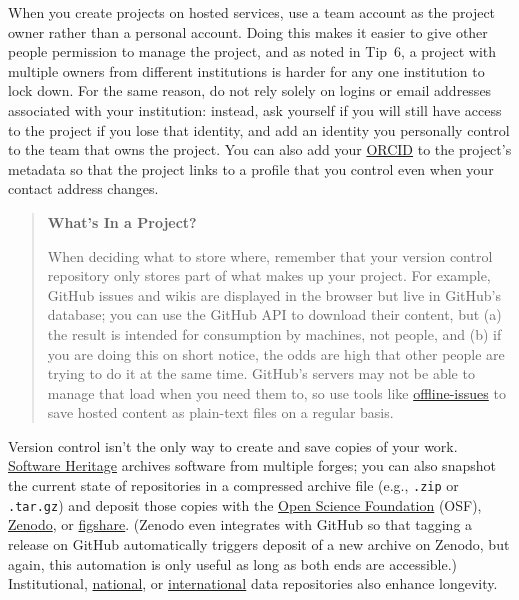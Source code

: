 \documentclass[10pt,letterpaper]{article}
\begin{document}
When you create projects on hosted services,
use a team account as the project owner rather than a personal account.
Doing this makes it easier to give other people permission to manage the project,
and as noted in Tip~6,
a project with multiple owners from different institutions
is harder for any one institution to lock down.
For the same reason,
do not rely solely on logins or email addresses associated with your institution:
instead,
ask yourself if you will still have access to the project if you lose that identity,
and add an identity you personally control to the team that owns the project.
You can also add your \href{https://orcid.org/}{ORCID} to the project's metadata
so that the project links to a profile that you control
even when your contact address changes.

\begin{quote}
  \noindent
  \textbf{What's In a Project?}

  When deciding what to store where,
  remember that your version control repository only stores part of what makes up your project.
  For example,
  GitHub issues and wikis are displayed in the browser but live in GitHub's database;
  you can use the GitHub API to download their content,
  but (a) the result is intended for consumption by machines, not people,
  and (b) if you are doing this on short notice,
  the odds are high that other people are trying to do it at the same time.
  GitHub's servers may not be able to manage that load when you need them to,
  so use tools like \href{https://github.com/jlord/offline-issues}{offline-issues}
  to save hosted content as plain-text files on a regular basis.
\end{quote}

Version control isn't the only way to create and save copies of your work.
\href{https://www.softwareheritage.org/how-to-archive-reference-code/}{Software Heritage} archives software from multiple forges;
you can also snapshot the current state of repositories in a compressed archive file
(e.g., \texttt{.zip} or \texttt{.tar.gz})
and deposit those copies with the \href{https://osf.io/}{Open Science Foundation} (OSF),
\href{https://zenodo.org/}{Zenodo},
or \href{https://figshare.com/}{figshare}.
(Zenodo even integrates with GitHub so that tagging a release on GitHub
automatically triggers deposit of a new archive on Zenodo,
but again,
this automation is only useful as long as both ends are accessible.)
Institutional,
\href{https://amt.coretrustseal.org/certificates/}{national},
or \href{https://safeguar.de/}{international} data repositories also enhance longevity.
\end{document}
